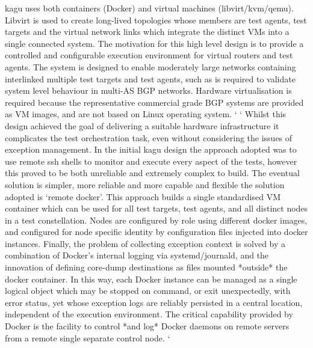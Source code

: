 kagu uses  both containers (Docker) and virtual machines (libvirt/kvm/qemu).  Libvirt is used to create long-lived topologies whose members are test agents, test targets and the virtual network links which integrate the distinct VMs into a single connected system.  The motivation for this high level design is to provide a controlled and configurable execution environment for virtual routers and test agents.  The system is designed to enable moderately large networks containing interlinked multiple test targets and test agents, such as is required to validate system level behaviour in multi-AS BGP networks.  Hardware virtualisation is required because the representative commercial grade BGP systems are provided as VM images, and are not based on Linux operating system. `
 `
Whilst this design achieved the goal of delivering a suitable hardware infrastructure it complicates the test orchestration task, even without considering the issues of exception management.  In the initial kagu design the approach adopted was to use remote ssh shells to monitor and execute every aspect of the tests, however this proved to be both unreliable and extremely complex to build.  The eventual solution is simpler, more reliable and more capable and flexible \- the solution adopted is ‘remote docker’.  This approach builds a single standardised VM container which can be used for all test targets, test agents, and all distinct nodes in a test constellation. Nodes are configured by role using different docker images, and configured for node specific identity by configuration files injected into docker instances.  Finally, the problem of collecting exception context is solved by a combination of Docker’s  internal logging via systemd/journald, and the innovation of defining core-dump destinations as files mounted *outside* the docker container.  In this way, each Docker instance can be managed as a single logical object which may be stopped on command, or exit unexpectedly, with error status, yet whose exception logs are reliably persisted in a central location, independent of the execution environment.  The critical capability provided by Docker is the facility to control *and log* Docker daemons on remote servers from a remote single separate control node. `

